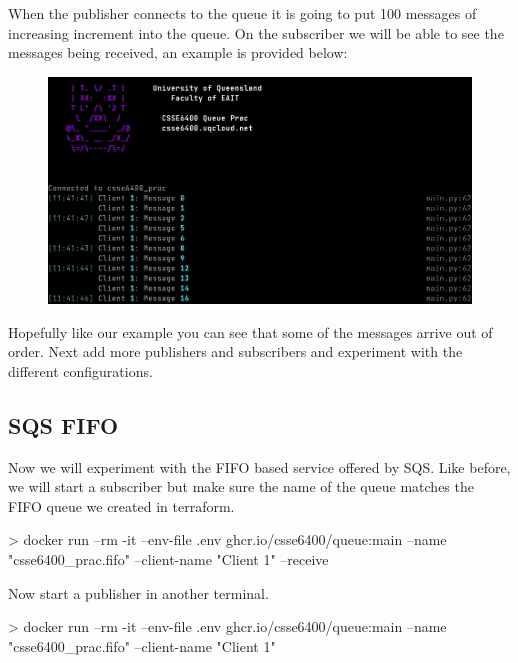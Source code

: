 \documentclass{csse4400}
\begin{document}
When the publisher connects to the queue it is going to put 100 messages of increasing increment into the queue.
On the subscriber we will be able to see the messages being received, an example is provided below:

\begin{figure}[H]
  \includegraphics[width=\textwidth]{images/stacksubdata}
\end{figure}

Hopefully like our example you can see that some of the messages arrive out of order.
Next add more publishers and subscribers and experiment with the different configurations.



\subsection{SQS FIFO}
Now we will experiment with the FIFO based service offered by SQS.
Like before, we will start a subscriber but make sure the name of the queue matches the FIFO queue we created in terraform.

\begin{code}[numbers=none,keepspaces=true]{}
> docker run --rm -it --env-file .env ghcr.io/csse6400/queue:main --name "csse6400_prac.fifo" --client-name "Client 1" --receive
\end{code}

Now start a publisher in another terminal.

\begin{code}[numbers=none,keepspaces=true]{}
> docker run --rm -it --env-file .env ghcr.io/csse6400/queue:main --name "csse6400_prac.fifo" --client-name "Client 1"
\end{code}
\end{document}
